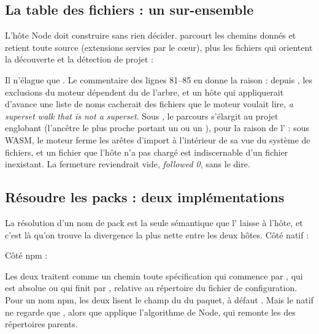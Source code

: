 \subsection{La table des fichiers : un sur-ensemble}

L'hôte Node doit construire  sans rien décider.  parcourt les chemins donnés et retient toute source (extensions servies par le cœur), plus les fichiers qui orientent la découverte et la détection de projet :


Il n'élague que . Le commentaire des lignes 81--85 en donne la raison : depuis , les exclusions du moteur dépendent du  de l'arbre, et un hôte qui appliquerait d'avance une liste de noms cacherait des fichiers que le moteur voulait lire, \og \emph{a superset walk that is not a superset}\fg{}. Sous , le parcours s'élargit au projet englobant (l'ancêtre le plus proche portant un  ou un ), pour la raison de l' : sous WASM, le moteur ferme les arêtes d'import à l'intérieur de sa vue du système de fichiers, et un fichier que l'hôte n'a pas chargé est indiscernable d'un fichier inexistant. La fermeture reviendrait vide, \og \emph{followed 0}\fg{}, sans le dire.

\subsection{Résoudre les packs : deux implémentations}
\label{sec:distribution-npm-resolution}

La résolution d'un nom de pack est la seule sémantique que l' laisse à l'hôte, et c'est là qu'on trouve la divergence la plus nette entre les deux hôtes. Côté natif :


Côté npm :


Les deux traitent comme un chemin toute spécification qui commence par , qui est absolue ou qui finit par , relative au répertoire du fichier de configuration. Pour un nom npm, les deux lisent le champ  du  du paquet, à défaut . Mais le natif ne regarde que , alors que  applique l'algorithme de Node, qui remonte les  des répertoires parents.

